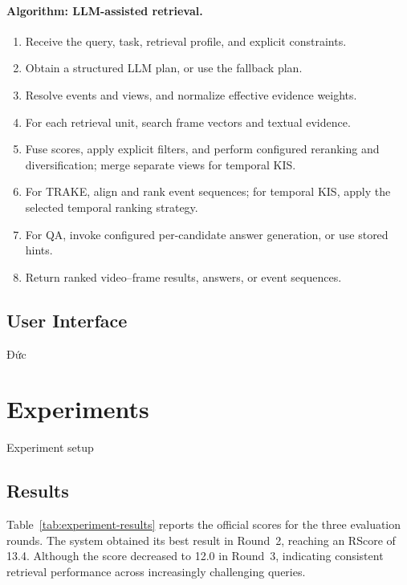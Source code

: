 \documentclass[11pt]{article}
\begin{document}
\paragraph{Algorithm: LLM-assisted retrieval.}
\begin{enumerate}
\setlength{\itemsep}{0pt}
\setlength{\parskip}{0pt}
\item Receive the query, task, retrieval profile, and explicit constraints.
\item Obtain a structured LLM plan, or use the fallback plan.
\item Resolve events and views, and normalize effective evidence weights.
\item For each retrieval unit, search frame vectors and textual evidence.
\item Fuse scores, apply explicit filters, and perform configured
      reranking and diversification; merge separate views for temporal KIS.
\item For TRAKE, align and rank event sequences; for temporal KIS,
      apply the selected temporal ranking strategy.
\item For QA, invoke configured per-candidate answer generation,
      or use stored hints.
\item Return ranked video--frame results, answers, or event sequences.
\end{enumerate}

\subsection{User Interface}
Đức 

\section{Experiments}
Experiment setup


\subsection{Results}

Table~\ref{tab:experiment-results} reports the official scores for the three evaluation rounds. The system obtained its best result in Round~2, reaching an RScore of 13.4. Although the score decreased to 12.0 in Round~3, indicating consistent retrieval performance across increasingly challenging queries.
\end{document}
